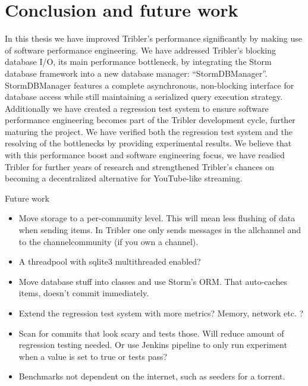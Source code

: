 \chapter{Conclusion and future work}
\label{cpt:conclusion_and_future_work}

In this thesis we have improved Tribler's performance significantly by making use of software performance engineering.
We have addressed Tribler's blocking database I/O, its main performance bottleneck, by integrating the Storm database framework into a new database manager: \enquote{StormDBManager}.
StormDBManager features a complete asynchronous, non-blocking interface for database access while still maintaining a serialized query execution strategy.
Additionally we have created a regression test system to ensure software performance engineering becomes part of the Tribler development cycle, further maturing the project.
We have verified both the regression test system and the resolving of the bottlenecks by providing experimental results.
We believe that with this performance boost and software engineering focus, we have readied Tribler for further years of research and strengthened Tribler's chances on becoming a decentralized alternative for YouTube-like streaming.


Future work

\begin{itemize}
	\item Move storage to a per-community level. This will mean less flushing of data when sending items. In Tribler one only sends messages in the allchannel and to the channelcommunity (if you own a channel).
	\item A threadpool with sqlite3 multithreaded enabled? 
	\item Move database stuff into classes and use Storm's ORM. That auto-caches items, doesn't commit immediately.
	\item Extend the regression test system with more metrics? Memory, network etc. ?
	\item Scan for commits that look scary \cite{huang2014performance} and tests those. Will reduce amount of regression testing needed. Or use Jenkins pipeline to only run experiment when a value is set to true or tests pass?
	\item Benchmarks not dependent on the internet, such as seeders for a torrent.
\end{itemize}